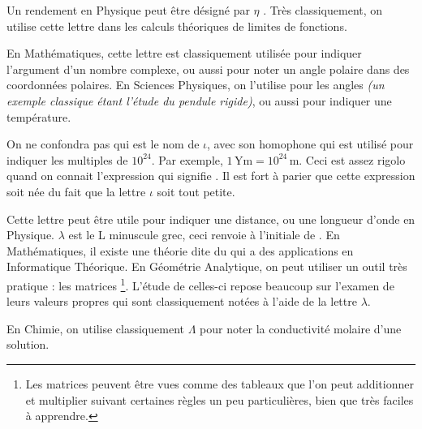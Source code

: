 \vspace{-0.3em}

\cadre{$\eta$} Un rendement en Physique peut être désigné par $\eta$ . Très classiquement, on utilise cette lettre dans les calculs théoriques de limites de fonctions.

\cadre{$\theta$} En Mathématiques, cette lettre est classiquement utilisée pour indiquer l'argument d’un nombre complexe, ou aussi pour noter un angle polaire dans des coordonnées polaires. En Sciences Physiques, on l'utilise pour les angles \emph{(un exemple classique étant l'étude du pendule rigide)}, ou aussi pour indiquer une température.

\cadre{$\iota$} On ne confondra pas  qui est le nom de $\iota$, avec son homophone  qui est utilisé pour indiquer les multiples de $10^{24}$. Par exemple, $1 \, \si{\yotta\metre} = 10^{24} \, \si{\metre}$. Ceci est assez rigolo quand on connait l'expression  qui signifie . Il est fort à parier que cette expression soit née du fait que la lettre $\iota$ soit tout petite.

\cadre{$\lambda$} Cette lettre peut être utile pour indiquer une distance, ou une longueur d'onde en Physique. $\lambda$ est le L minuscule grec, ceci renvoie à l'initiale de .
En Mathématiques, il existe une théorie dite du  qui a des applications en Informatique Théorique.
En Géométrie Analytique, on peut utiliser un outil très pratique : les matrices
	\footnote{Les matrices peuvent être vues comme des tableaux que l'on peut additionner et multiplier suivant certaines règles un peu particulières, bien que très faciles à apprendre.}.
L'étude de celles-ci repose beaucoup sur l'examen de leurs valeurs propres qui sont classiquement notées à l'aide de la lettre $\lambda$.

\cadre{$\Lambda$} En Chimie, on utilise classiquement $\Lambda$ pour noter la conductivité molaire d'une solution.

\vspace{0.8em}

